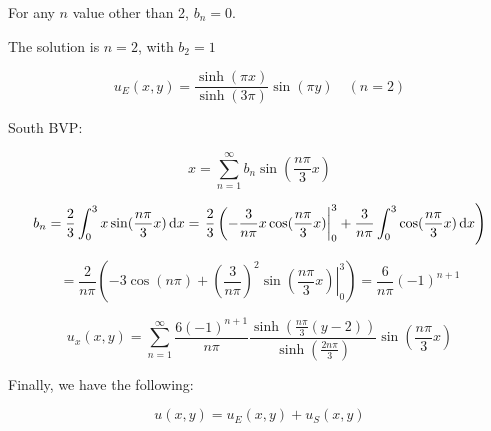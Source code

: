 \documentclass{article}
\begin{document}
For any $n$ value other than 2, $b_n = 0$. 

The solution is $n = 2$, with $b_2 = 1$

$$u_E (x,y) = \frac{\sinh ( \pi x)}{\sinh (3 \pi)} \sin(\pi y) \quad (n = 2)$$

South BVP:

$$x = \sum_{n=1}^\infty b_n \sin( \frac{n \pi}{3} x)$$

$$b_n = \frac{2}{3} \int_0^3 x \sin( \frac{n \pi}{3} x) \,\mathrm{d} x = \left. \frac{2}{3} \left( - \frac{3}{n \pi} x \cos( \frac{n \pi}{3} x) \right|_0^3 + \frac{3}{n \pi} \int_0^3 \cos( \frac{n \pi}{3} x) \,\mathrm{d} x \right)$$


$$ = \frac{2}{n \pi} \left(-3 \cos(n \pi) + ( \frac{3}{n \pi})^2 \left. \sin( \frac{n \pi}{3} x) \right|_0^3 \right)= \frac{6}{n \pi} (-1)^{n + 1}$$

$$u_x(x,y) = \sum_{n=1}^\infty \frac{6 (-1)^{n+1}}{n \pi} \frac{ \sinh( \frac{n \pi}{3} (y-2))}{\sinh( \frac{2 n\pi}{3})}  \sin( \frac{n \pi}{3} x)$$

Finally, we have the following:

$$u(x,y) = u_E (x,y) + u_S (x,y)$$
\end{document}
